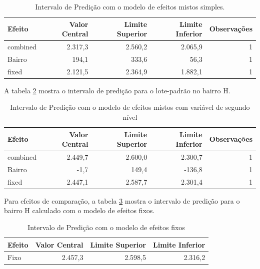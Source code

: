 \documentclass[
  a4paper, 12pt]{article}
\begin{document}
\begin{table}[H]

\caption{\label{tab:pred1}Intervalo de Predição com o modelo de efeitos mistos simples.}
\centering
\fontsize{10}{12}\selectfont
\begin{tabular}[t]{lrrrr}
\toprule
Efeito & Valor Central & Limite Superior & Limite Inferior & Observações\\
\midrule
\rowcolor{gray!6}  combined & 2.317,3 & 2.560,2 & 2.065,9 & 1\\
Bairro & 194,1 & 333,6 & 56,3 & 1\\
\rowcolor{gray!6}  fixed & 2.121,5 & 2.364,9 & 1.882,1 & 1\\
\bottomrule
\end{tabular}
\end{table}

A tabela \ref{tab:pred2} mostra o intervalo de predição para o
lote-padrão no bairro H.

\begin{table}[H]

\caption{\label{tab:pred2}Intervalo de Predição com o modelo de efeitos mistos com variável de segundo nível}
\centering
\fontsize{10}{12}\selectfont
\begin{tabular}[t]{lrrrr}
\toprule
Efeito & Valor Central & Limite Superior & Limite Inferior & Observações\\
\midrule
\rowcolor{gray!6}  combined & 2.449,7 & 2.600,0 & 2.300,7 & 1\\
Bairro & -1,7 & 149,4 & -136,8 & 1\\
\rowcolor{gray!6}  fixed & 2.447,1 & 2.587,7 & 2.301,4 & 1\\
\bottomrule
\end{tabular}
\end{table}

Para efeitos de comparação, a tabela \ref{tab:pred3} mostra o intervalo
de predição para o bairro H calculado com o modelo de efeitos fixos.

\begin{table}[H]

\caption{\label{tab:pred3}Intervalo de Predição com o modelo de efeitos fixos}
\centering
\fontsize{10}{12}\selectfont
\begin{tabular}[t]{lrrr}
\toprule
Efeito & Valor Central & Limite Superior & Limite Inferior\\
\midrule
\rowcolor{gray!6}  Fixo & 2.457,3 & 2.598,5 & 2.316,2\\
\bottomrule
\end{tabular}
\end{table}
\end{document}
